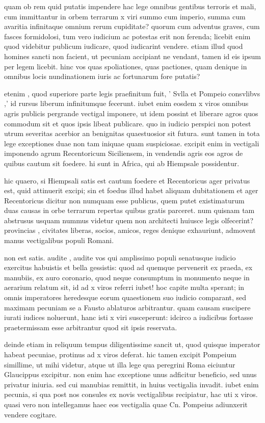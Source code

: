  quam ob rem quid putatis impendere hac lege omnibus gentibus terroris et mali, cum immittantur in orbem terrarum x viri summo cum imperio, summa cum avaritia infinitaque omnium rerum cupiditate? quorum cum adventus graves, cum fasces formidolosi, tum vero iudicium ac potestas erit non ferenda; licebit enim quod videbitur publicum iudicare, quod iudicarint vendere. etiam illud quod homines sancti non facient, ut pecuniam accipiant ne vendant, tamen id eis ipsum per legem licebit. hinc vos quas spoliationes, quas pactiones, quam denique in omnibus locis nundinationem iuris ac fortunarum fore putatis?

 etenim , quod superiore parte legis praefinitum fuit, ' Svlla et Pompeio consvlibvs ,' id rursus liberum infinitumque fecerunt. iubet enim eosdem x viros omnibus agris publicis pergrande vectigal imponere, ut idem possint et liberare agros quos commodum sit et quos ipsis libeat publicare. quo in iudicio perspici non potest utrum severitas acerbior an benignitas quaestuosior sit futura. sunt tamen in tota lege exceptiones duae non tam iniquae quam suspiciosae. excipit enim in vectigali imponendo agrum Recentoricum Siciliensem, in vendendis agris eos agros de quibus cautum sit foedere. hi sunt in Africa, qui ab Hiempsale possidentur.

 hic quaero, si Hiempsali satis est cautum foedere et Recentoricus ager privatus est, quid attinuerit excipi; sin et foedus illud habet aliquam dubitationem et ager Recentoricus dicitur non numquam esse publicus, quem putet existimaturum duas causas in orbe terrarum repertas quibus gratis parceret. num quisnam tam abstrusus usquam nummus videtur quem non architecti huiusce legis olfecerint? provincias , civitates liberas, socios, amicos, reges denique exhauriunt, admovent manus vectigalibus populi Romani.

 non est satis. audite , audite vos qui amplissimo populi senatusque iudicio exercitus habuistis et bella gessistis: quod ad quemque pervenerit ex praeda, ex manubiis, ex auro coronario, quod neque consumptum in monumento neque in aerarium relatum sit, id ad x viros referri iubet! hoc capite multa sperant; in omnis imperatores heredesque eorum quaestionem suo iudicio comparant, sed maximam pecuniam se a Fausto ablaturos arbitrantur. quam causam suscipere iurati iudices noluerunt, hanc isti x viri susceperunt: idcirco a iudicibus fortasse praetermissam esse arbitrantur quod sit ipsis reservata.

 deinde etiam in reliquum tempus diligentissime sancit ut, quod quisque imperator habeat pecuniae, protinus ad x viros deferat. hic tamen excipit Pompeium simillime, ut mihi videtur, atque ut illa lege qua peregrini Roma eiciuntur Glaucippus excipitur. non enim hac exceptione unus adficitur beneficio, sed unus privatur iniuria. sed cui manubias remittit, in huius vectigalia invadit. iubet enim pecunia, si qua post nos consules ex novis vectigalibus recipiatur, hac uti x viros. quasi vero non intellegamus haec eos vectigalia quae Cn. Pompeius adiunxerit vendere cogitare.

